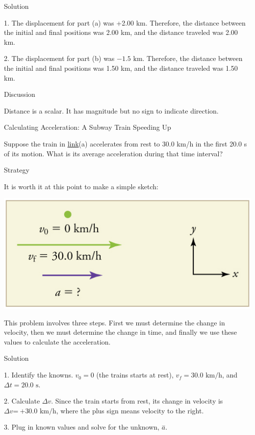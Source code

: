\documentclass[
]{book}
\begin{document}
{Solution}

1. The displacement for part (a) was +2.00 km. Therefore, the distance
between the initial and final positions was 2.00 km, and the distance
traveled was 2.00 km.

2. The displacement for part (b) was \(\text{−1.5\ km.}\) Therefore, the
distance between the initial and final positions was 1.50 km, and the
distance traveled was 1.50 km.

{Discussion}

Distance is a scalar. It has magnitude but no sign to indicate
direction.

\hypertarget{fs-id1372721}{}
Calculating Acceleration: A Subway Train Speeding Up

Suppose the train in
\protect\hyperlink{import-auto-id2590556}{link}(a) accelerates
from rest to 30.0 km/h in the first 20.0 s of its motion. What is its
average acceleration during that time interval?

{Strategy}

It is worth it at this point to make a simple sketch:

\includegraphics{images/Figure_02_03_03c.jpg}

This problem involves three steps. First we must determine the change in
velocity, then we must determine the change in time, and finally we use
these values to calculate the acceleration.

{Solution}

1. Identify the knowns. \({v_{0} = 0}{}\) (the trains starts at rest),
\({{v_{f} = \text{30}}\text{.}\text{0\ km/h}}{}\), and
\({{\Delta t = \text{20}}\text{.}\text{0\ s}}{}\).

2. Calculate \({\Delta v}{}\). Since the train starts from rest, its
change in velocity is \(\Delta v\text{=}\ \text{+}\text{30.0\ km/h}\),
where the plus sign means velocity to the right.

3. Plug in known values and solve for the unknown, \(\overset{-}{a}{}\).
\end{document}
